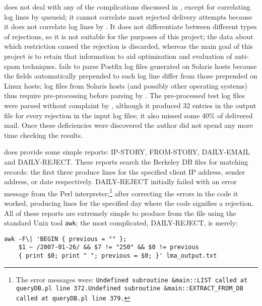  does not deal with any of the complications discussed in
, except for correlating log lines by queueid; it
cannot correlate most rejected delivery attempts because it does not
correlate log lines by .  It does not differentiate between
different types of rejections, so it is not suitable for the purposes of
this project; the data about which restriction caused the rejection is
discarded, whereas the main goal of this project is to retain that
information to aid optimisation and evaluation of anti-spam techniques.
 fails to parse Postfix log files generated on Solaris hosts
because the fields automatically prepended to each log line differ from
those prepended on Linux hosts; log files from Solaris hosts (and possibly
other operating systems) thus require pre-processing before parsing by
.  The \numberOFlogFILES{} pre-processed test log files were
parsed without complaint by , although it produced 32 entries
in the output  file for every rejection in the input log
files; it also missed some 40\% of delivered mail.  Once these deficiencies
were discovered the author did not spend any more time checking the
results.

 does provide some simple reports: IP-STORY, FROM-STORY,
DAILY-EMAIL and DAILY-REJECT\@.  These reports search the Berkeley DB files
for matching records: the first three produce  lines for the
specified client IP address, sender address, or date respectively.
DAILY-REJECT initially failed with an error message from the Perl
interpreter;\footnote{The error messages were: \newline{}\texttt{Undefined
subroutine \&main::LIST called at queryDB.pl line
372.}\newline{}\texttt{Undefined subroutine \&main::EXTRACT\_FROM\_DB
called at queryDB.pl line 379.}} after correcting the errors in the code it
worked, producing  lines for the specified day where the
 code signifies a rejection.  All of these reports are
extremely simple to produce from the  file using the standard
Unix tool \texttt{awk}; the most complicated, DAILY-REJECT, is
merely:


\begin{verbatim}
awk -F\| 'BEGIN { previous = "" };
    $1 ~ /2007-01-26/ && $7 != "250" && $0 != previous
    { print $0; print " "; previous = $0; }' lma_output.txt
\end{verbatim}

